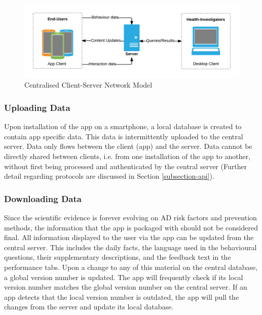 \begin{figure}[h]
    \centering
    \includegraphics[scale=0.9, angle=0]{Files/prevention-study-1/figures/client-server}
    \caption{Centralised Client-Server Network Model}
    \label{fig: clientserver-model}
\end{figure}

\subsubsection{Uploading Data}
Upon installation of the app on a smartphone, a local database is created to contain app specific data. This data is intermittently uploaded to the central server. Data only flows between the client (app) and the server. Data cannot be directly shared between clients, i.e. from one installation of the app to another, without first being processed and authenticated by the central server (Further detail regarding protocols are discussed in Section \ref{subsection-api}).

\subsubsection{Downloading Data}
Since the scientific evidence is forever evolving on AD risk factors and prevention methods, the information that the app is packaged with should not be considered final. All information displayed to the user via the app can be updated from the central server. This includes the daily facts, the language used in the behavioural questions, their supplementary descriptions, and the feedback text in the performance tabs. Upon a change to any of this material on the central database, a global version number is updated. The app will frequently check if its local version number matches the global version number on the central server. If an app detects that the local version number is outdated, the app will pull the changes from the server and update its local database.

